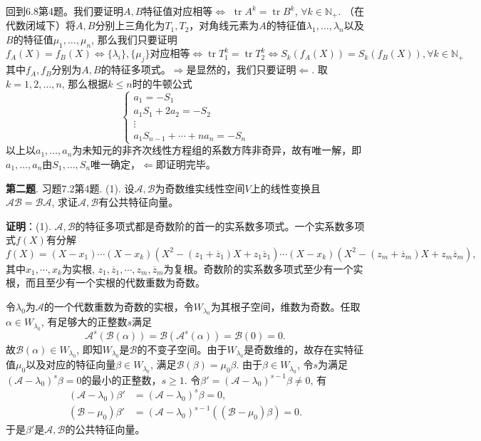 回到6.8第4题。我们要证明$A, B$特征值对应相等$\Longleftrightarrow$ $\operatorname{tr} A^k = \operatorname{tr} B^k$, $\forall k \in \mathbb{N}_+$. （在代数闭域下）将$A,B$分别上三角化为$T_1, T_2$，对角线元素为$A$的特征值$\lambda_1,\ldots,\lambda_n$以及$B$的特征值$\mu_1,\ldots,\mu_n$, 那么我们只要证明
$$f_A(X) = f_B(X) \Longleftrightarrow \{\lambda_i\}, \{\mu_j\}\text{对应相等} \Longleftrightarrow \operatorname{tr} T_1^k = \operatorname{tr} T_2^k \Longleftrightarrow S_k(f_A(X)) = S_k(f_B(X)), \forall k \in \mathbb{N}_+$$
其中$f_A, f_B$分别为$A,B$的特征多项式。$\Longrightarrow$是显然的，我们只要证明$\Longleftarrow$. 取$k = 1, 2, \ldots, n$, 那么根据$k \leqslant n$时的牛顿公式
$$
\begin{cases}
a_1 = -S_1 \\
a_1S_1 + 2a_2 = -S_2 \\
\vdots \\
a_1S_{n-1} + \cdots + na_n = -S_n
\end{cases}
$$
以上以$a_1,\ldots,a_n$为未知元的非齐次线性方程组的系数方阵非奇异，故有唯一解，即$a_1,\ldots,a_n$由$S_1,\ldots,S_n$唯一确定，$\Longleftarrow$即证明完毕。


\newpageorvspace


{\bf 第二题}. 习题7.2第4题. (1). 设$\mathscr{A,B}$为奇数维实线性空间$V$上的线性变换且$\mathscr{AB} = \mathscr{BA}$, 求证$\mathscr{A,B}$有公共特征向量。

\newpageorvspace

{\bf 证明}：(1). $\mathscr{A,B}$的特征多项式都是奇数阶的首一的实系数多项式。一个实系数多项式$f(X)$有分解
$$f(X) = (X-x_1) \cdots (X-x_k) (X^2 - (z_1+\overline{z}_1)X + z_1\overline{z}_1) \cdots (X-x_k) (X^2 - (z_m+\overline{z}_m)X + z_m\overline{z}_m),$$
其中$x_1, \cdots, x_k$为实根, $z_1, \overline{z}_1, \cdots, z_m, \overline{z}_m$为复根。奇数阶的实系数多项式至少有一个实根，而且至少有一个实根的代数重数为奇数。

令$\lambda_0$为$\mathscr{A}$的一个代数重数为奇数的实根，令$W_{\lambda_0}$为其根子空间，维数为奇数。任取$\alpha \in W_{\lambda_0}$, 有足够大的正整数$s$满足
$$\mathscr{A}^s(\mathscr{B}(\alpha)) = \mathscr{B} (\mathscr{A}^s(\alpha)) = \mathscr{B}(0) = 0.$$
故$\mathscr{B}(\alpha) \in W_{\lambda_0}$, 即知$W_{\lambda_0}$是$\mathscr{B}$的不变子空间。由于$W_{\lambda_0}$是奇数维的，故存在实特征值$\mu_0$以及对应的特征向量$\beta \in W_{\lambda_0}$, 满足$\mathscr{B}(\beta) = \mu_0 \beta$. 由于$\beta \in W_{\lambda_0}$, 令$s$为满足
$(\mathscr{A} - \lambda_0)^s \beta = 0$的最小的正整数，$s \geqslant 1$. 令$\beta' = (\mathscr{A} - \lambda_0)^{s-1} \beta \neq 0$, 有
\begin{align*}
(\mathscr{A} - \lambda_0) \beta' & = (\mathscr{A} - \lambda_0)^s \beta = 0, \\
(\mathscr{B} - \mu_0) \beta' & = (\mathscr{A} - \lambda_0)^{s-1} ((\mathscr{B} - \mu_0) \beta) = 0.
\end{align*}
于是$\beta'$是$\mathscr{A,B}$的公共特征向量。

